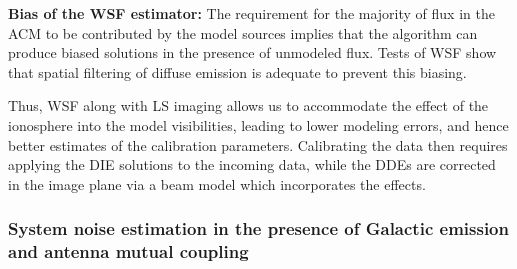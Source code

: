 \documentclass{aa}
\begin{document}
\begin{table}[tbh]
\caption{Flux ratios of bright sources withina snapshot from Obs. 3.}
\label{tab:Flux-ratios-of-1}
\end{table}


\textbf{Bias of the WSF estimator:} The  requirement for the majority of flux in
the ACM  to be contributed by the  model sources implies that  the algorithm can
produce biased solutions  in the presence of unmodeled flux.   Tests of WSF show
that spatial filtering of diffuse emission is adequate to prevent this biasing.

Thus,  WSF along with  LS imaging  allows us  to accommodate  the effect  of the
ionosphere into  the model visibilities,  leading to lower modeling  errors, and
hence better estimates of the calibration parameters.  Calibrating the data then
requires applying  the DIE solutions  to the incoming  data, while the  DDEs are
corrected in the image plane via a beam model which incorporates the effects.

\subsubsection{\label{sub:System-noise-estimation}System noise estimation in the
presence of Galactic emission and antenna mutual coupling}
\end{document}
